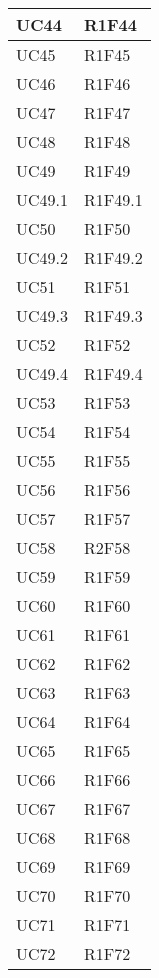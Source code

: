 \begin{center}
\begin{longtable}{|p{44mm}|p{22mm}|}
\hline
UC44 &
R1F44 
\\
\hline
UC45 &
R1F45 
\\
\hline
UC46 &
R1F46 
\\
\hline
UC47 &
R1F47 
\\
\hline
UC48 &
R1F48 
\\
\hline
UC49 &
R1F49 
\\
\hline
UC49.1 &
R1F49.1 
\\
\hline
UC50 &
R1F50 
\\
\hline
UC49.2 &
R1F49.2 
\\
\hline
UC51 &
R1F51 
\\
\hline
UC49.3 &
R1F49.3 
\\
\hline
UC52 &
R1F52 
\\
\hline
UC49.4 &
R1F49.4 
\\
\hline
UC53 &
R1F53 
\\
\hline
UC54 &
R1F54 
\\
\hline
UC55 &
R1F55 
\\
\hline
UC56 &
R1F56 
\\
\hline
UC57 &
R1F57 
\\
\hline
UC58 &
R2F58 
\\
\hline
UC59 &
R1F59 
\\
\hline
UC60 &
R1F60 
\\
\hline
UC61 &
R1F61 
\\
\hline
UC62 &
R1F62 
\\
\hline
UC63 &
R1F63 
\\
\hline
UC64 &
R1F64 
\\
\hline
UC65 &
R1F65 
\\
\hline
UC66 &
R1F66 
\\
\hline
UC67 &
R1F67 
\\
\hline
UC68 &
R1F68 
\\
\hline
UC69 &
R1F69 
\\
\hline
UC70 &
R1F70 
\\
\hline
UC71 &
R1F71 
\\
\hline
UC72 &
R1F72 
\\
\hline%
		
	\end{longtable}
\end{center}

